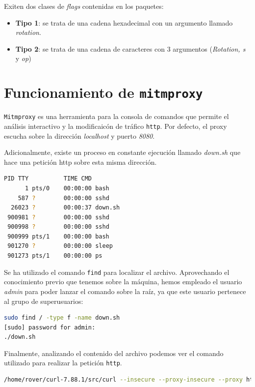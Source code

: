 \documentclass[]{article}
\begin{document}
Exiten dos clases de \textit{flags} contenidas en los paquetes:
\begin{itemize}
    \item \textbf{Tipo 1}: se trata de una cadena hexadecimal con un argumento
    llamado \textit{rotation}.
    \item \textbf{Tipo 2}: se trata de una cadena de caracteres con 3
    argumentos (\textit{Rotation, s} y \textit{op})
\end{itemize}

\section{Funcionamiento de \texttt{mitmproxy}}
\label{sec:proxy}

\texttt{Mitmproxy} es una herramienta para la consola de comandos que permite
el análisis interactivo y la modificaicón de tráfico \texttt{http}. Por
defecto, el proxy escucha sobre la dirección \textit{localhost} y puerto
\textit{8080}.

Adicionalmente, existe un proceso en constante ejecución llamado
\textit{down.sh} que hace una petición http sobre esta misma dirección.

\begin{lstlisting}[language=bash, caption=Resultado de ejecutar ps -e]
   PID TTY          TIME CMD
      1 pts/0    00:00:00 bash
    587 ?        00:00:00 sshd
  26023 ?        00:00:37 down.sh
 900981 ?        00:00:00 sshd
 900998 ?        00:00:00 sshd
 900999 pts/1    00:00:00 bash
 901270 ?        00:00:00 sleep
 901273 pts/1    00:00:00 ps
\end{lstlisting}

Se ha utilizado el comando \texttt{find} para localizar el archivo. Aprovechando el conocimiento previo que tenemos sobre la máquina, hemos empleado el usuario \textit{admin} para poder lanzar el comando sobre la raíz, ya que este usuario pertenece al grupo de superusuarios: 

\begin{lstlisting}[language=bash, caption=Resultado de ejecutar find]
sudo find / -type f -name down.sh
[sudo] password for admin:
./down.sh
\end{lstlisting}

Finalmente, analizando el contenido del archivo podemos ver el comando
utilizado para realizar la petición \texttt{http}.
\begin{lstlisting}[language=bash, caption=petición http a través del comando curl]
    /home/rover/curl-7.88.1/src/curl --insecure --proxy-insecure --proxy https://172.17.0.19:8080 https://172.17.0.4:4443/
\end{lstlisting}
\end{document}
